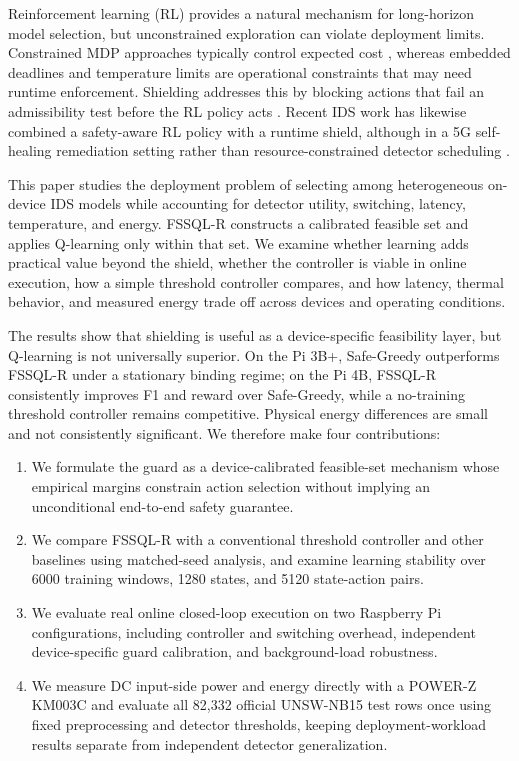\documentclass[journal]{IEEEtran}
\begin{document}
Reinforcement learning (RL) provides a natural mechanism for long-horizon model selection, but unconstrained exploration can violate deployment limits. Constrained MDP approaches typically control expected cost \cite{altman1999cmdp,achiam2017cpo,chow2018lyapunov}, whereas embedded deadlines and temperature limits are operational constraints that may need runtime enforcement. Shielding addresses this by blocking actions that fail an admissibility test before the RL policy acts \cite{alshiekh2018shielding,carr2023partialshielding,koenighofer2025shields}. Recent IDS work has likewise combined a safety-aware RL policy with a runtime shield, although in a 5G self-healing remediation setting rather than resource-constrained detector scheduling \cite{malwi2026safetyaware}.

This paper studies the deployment problem of selecting among heterogeneous on-device IDS models while accounting for detector utility, switching, latency, temperature, and energy. FSSQL-R constructs a calibrated feasible set and applies Q-learning only within that set. We examine whether learning adds practical value beyond the shield, whether the controller is viable in online execution, how a simple threshold controller compares, and how latency, thermal behavior, and measured energy trade off across devices and operating conditions.

The results show that shielding is useful as a device-specific feasibility layer, but Q-learning is not universally superior. On the Pi 3B+, Safe-Greedy outperforms FSSQL-R under a stationary binding regime; on the Pi 4B, FSSQL-R consistently improves F1 and reward over Safe-Greedy, while a no-training threshold controller remains competitive. Physical energy differences are small and not consistently significant. We therefore make four contributions:
\begin{enumerate}[leftmargin=*,itemsep=1pt]
\item We formulate the guard as a device-calibrated feasible-set mechanism whose empirical margins constrain action selection without implying an unconditional end-to-end safety guarantee.
\item We compare FSSQL-R with a conventional threshold controller and other baselines using matched-seed analysis, and examine learning stability over 6000 training windows, 1280 states, and 5120 state-action pairs.
\item We evaluate real online closed-loop execution on two Raspberry Pi configurations, including controller and switching overhead, independent device-specific guard calibration, and background-load robustness.
\item We measure DC input-side power and energy directly with a POWER-Z KM003C and evaluate all 82,332 official UNSW-NB15 test rows once using fixed preprocessing and detector thresholds, keeping deployment-workload results separate from independent detector generalization.
\end{enumerate}
\end{document}
